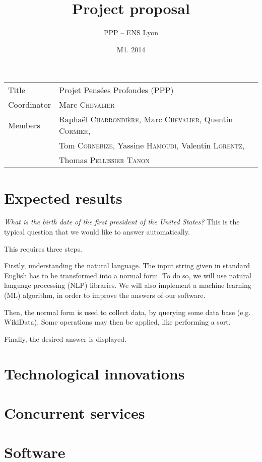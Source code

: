 \documentclass[a4paper,10pt]{article}
\title{Project proposal}
\author{PPP \--- ENS Lyon}
\date{M1. 2014}
\begin{document}
\maketitle

\begin{tabular}{|ll|}
\hline
Title & Projet Pensées Profondes (PPP)\\
Coordinator & Marc \textsc{Chevalier}\\
Members & Raphaël \textsc{Charrondière}, Marc \textsc{Chevalier}, Quentin \textsc{Cormier}, \\
        & Tom \textsc{Cornebize}, Yassine \textsc{Hamoudi}, Valentin \textsc{Lorentz},\\
        & Thomas \textsc{Pellissier} \textsc{Tanon}\\
\hline
\end{tabular}

\section{Expected results}
\emph{What is the birth date of the first president of the United States?} This is
the typical question that we would like to answer automatically.

This requires three steps. 

Firstly, understanding the natural language. The input string given in standard 
English has to be transformed into a normal form. To do so, we will use natural 
language processing (NLP) libraries. We will also implement a machine learning (ML)
algorithm, in order to improve the answers of our software.

Then, the normal form is used to collect data, by querying some data base (e.g.
WikiData). Some operations may then be applied, like performing a sort.

Finally, the desired answer is displayed.


\section{Technological innovations}

\section{Concurrent services}

\section{Software}
\end{document}
